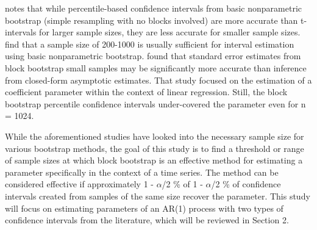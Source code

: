 \documentclass[12pt, letterpaper, titlepage]{article}
\begin{document}
\citet{hesterberg2015teachers} notes that while percentile-based confidence intervals from basic nonparametric bootstrap (simple resampling with no blocks involved) are more accurate than t-intervals for larger sample sizes, they are less accurate for smaller sample sizes. \citet{nevitt2001performance} find that a sample size of 200-1000 is usually sufficient for interval estimation using basic nonparametric bootstrap.
\citet{goncalves2005bootstrap} found that standard error estimates from block bootstrap small 
samples may be significantly more accurate than inference from closed-form asymptotic estimates. That study focused on the estimation of a coefficient parameter within the context of linear regression. Still, the block bootstrap percentile confidence intervals under-covered the parameter even for n = 1024. 

While the aforementioned studies have looked into the necessary sample size for various bootstrap methods, the goal of this study is to find a threshold or range of sample sizes at which block bootstrap 
is an effective method for estimating a parameter specifically in the context of a time series. The method can be considered effective if approximately 1 - $\alpha$/2 \% of 1 - $\alpha$/2 \% of confidence intervals created from samples of the same size recover the parameter. This study will focus on estimating parameters of an AR(1) process with two types of confidence intervals from the literature, \citep{diciccio1996bootstrap}  \citep{rice2006mathematical} which will be reviewed in Section 2.



\end{document}
